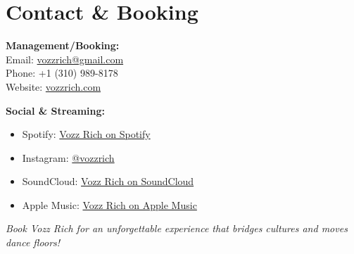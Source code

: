 \documentclass[11pt]{article}
\begin{document}
\section{ Contact \& Booking}
\textbf{Management/Booking:}\\
Email: \href{mailto:vozzrich@gmail.com}{vozzrich@gmail.com}\\
Phone: +1 (310) 989-8178\\
Website: \href{https://vozzrich.com}{vozzrich.com}

\textbf{Social \& Streaming:}
\begin{itemize}[leftmargin=*]
\item Spotify: \href{https://open.spotify.com/artist/27sSKrytmUXukDnMGPXNHQ}{Vozz Rich on Spotify}
\item Instagram: \href{https://instagram.com/vozzrich}{@vozzrich}
\item SoundCloud: \href{https://soundcloud.com/user-322739985}{Vozz Rich on SoundCloud}
\item Apple Music: \href{https://music.apple.com/us/artist/vozz-rich/1675984686}{Vozz Rich on Apple Music}
\end{itemize}

\vspace{1em}
\begin{center}
\textit{Book Vozz Rich for an unforgettable experience that bridges cultures and moves dance floors!}
\end{center}
\end{document}
